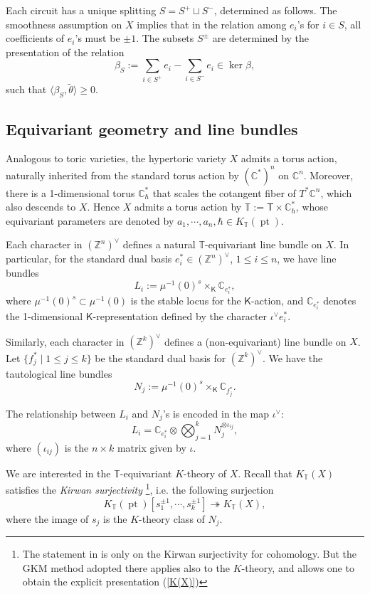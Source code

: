 \documentclass[10pt]{amsart}
\theoremstyle{definition}
\def\ZZ{{\mathbb{Z}}}
\def\CC{{\mathbb{C}}}
\def\TT{\mathbb{T}}
\newcommand{\pt}{\operatorname{pt}}
\newcommand{\bT}{\mathsf{T}}
\newcommand{\bK}{\mathsf{K}}
\theoremstyle{definition}
\numberwithin{equation}{section}
\theoremstyle{Theorem}
\begin{document}
Each circuit has a unique splitting $S = S^+ \sqcup S^-$, determined as follows. The smoothness assumption on $X$ implies that in  the relation among $e_i$'s for $i\in S$, all coefficients of $e_i$'s must be $\pm 1$. The subsets $S^\pm$ are determined by the presentation of the relation
$$
\beta_S := \sum_{i\in S^+} e_i - \sum_{i\in S^-} e_i \in \ker \beta,
$$
such that $\langle \beta_S, \widetilde\theta \rangle \geq 0$.






\subsection{Equivariant geometry and line bundles}

Analogous to toric varieties, the hypertoric variety $X$ admits a torus action, naturally inherited from the standard torus action by $(\CC^*)^n$ on $\CC^n$. Moreover, there is a 1-dimensional torus $\CC^*_\hbar$ that scales the cotangent fiber of $T^* \CC^n$, which also descends to $X$. Hence $X$ admits a torus action by $\TT := \bT \times \CC^*_\hbar$, whose equivariant parameters are denoted by $a_1, \cdots, a_n, \hbar \in K_\TT (\pt)$.

Each character in $(\ZZ^n)^\vee$ defines a natural $\TT$-equivariant line bundle on $X$. In particular, for the standard dual basis $e_i^* \in (\ZZ^n)^\vee$, $1\leq i\leq n$, we have line bundles
$$
L_i := \mu^{-1}(0)^s \times_\bK \CC_{e_i^*},
$$
where $\mu^{-1}(0)^s \subset \mu^{-1}(0)$ is the stable locus for the $\bK$-action, and $\CC_{e_i^*}$ denotes the 1-dimensional $\bK$-representation defined by the character $\iota^\vee e_i^*$.

Similarly, each character in $(\ZZ^k)^\vee$ defines a (non-equivariant) line bundle on $X$. Let $\{f_j^* \mid 1\leq j\leq k\}$ be the standard dual basis for $(\ZZ^k)^\vee$. We have the tautological line bundles
$$
N_j := \mu^{-1}(0)^s \times_\bK \CC_{f_j^*}.
$$

The relationship between $L_i$ and $N_j$'s is encoded in the map $\iota^\vee$:
\begin{equation} \label{LL}
L_i = \CC_{e_i^*} \otimes \bigotimes_{j=1}^k N_j^{\otimes \iota_{ij}},
\end{equation}
where $(\iota_{ij})$ is the $n\times k$ matrix given by $\iota$.

We are interested in the $\TT$-equivariant $K$-theory of $X$. Recall that \cite{HH} $K_\TT (X)$ satisfies the \emph{Kirwan surjectivity} \footnote{The statement in \cite{HH} is only on the Kirwan surjectivity for cohomology. But the GKM method adopted there applies also to the $K$-theory, and allows one to obtain the explicit presentation (\ref{K(X)})}, i.e. the following surjection
$$
K_\TT (\pt) [s_1^{\pm 1}, \cdots, s_k^{\pm 1} ] \twoheadrightarrow K_\TT (X),
$$
where the image of $s_j$ is the $K$-theory class of $N_j$.
\end{document}

